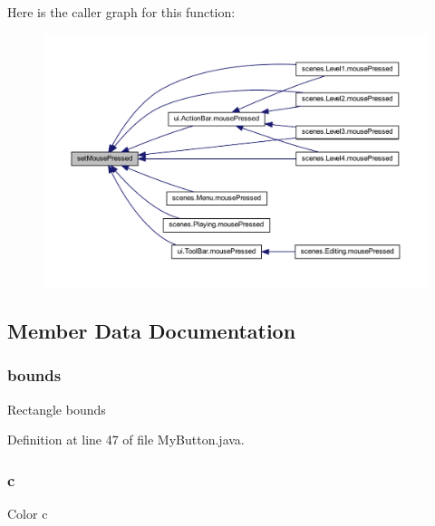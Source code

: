 Here is the caller graph for this function\+:\nopagebreak
\begin{figure}[H]
\begin{center}
\leavevmode
\includegraphics[width=350pt]{classui_1_1_my_button_a773d9d0a3424f8007205c7011f69c723_icgraph}
\end{center}
\end{figure}


\subsection{Member Data Documentation}
\mbox{\label{classui_1_1_my_button_a62df0866a4faf552c81108aff64e8eff}} 
\subsubsection{\texorpdfstring{bounds}{bounds}}
{\footnotesize\ttfamily Rectangle bounds}



Definition at line 47 of file My\+Button.\+java.

\mbox{\label{classui_1_1_my_button_a02094092ae89aa4b23bff1976bcbf90d}} 
\subsubsection{\texorpdfstring{c}{c}}
{\footnotesize\ttfamily Color c\hspace{0.3cm}{\ttfamily [private]}}



